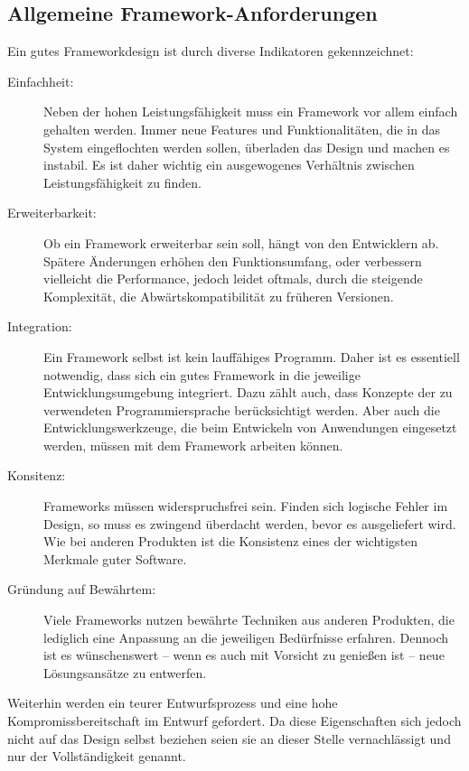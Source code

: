 \documentclass{hswpaper}
\begin{document}
\subsection{Allgemeine Framework-Anforderungen}
Ein gutes Frameworkdesign ist durch diverse Indikatoren gekennzeichnet:\begin{description}
    \item[Einfachheit:] Neben der hohen Leistungsfähigkeit muss ein Framework vor allem einfach gehalten werden. Immer neue Features und Funktionalitäten, die in das System eingeflochten werden sollen, überladen das Design und machen es instabil. Es ist daher wichtig ein ausgewogenes Verhältnis zwischen Leistungsfähigkeit zu finden.
    \item[Erweiterbarkeit:] Ob ein Framework erweiterbar sein soll, hängt von den Entwicklern ab. Spätere Änderungen erhöhen den Funktionsumfang, oder verbessern vielleicht die Performance, jedoch leidet oftmals, durch die steigende Komplexität, die Abwärtskompatibilität zu früheren Versionen.
    \item[Integration:] Ein Framework selbst ist kein lauffähiges Programm. Daher ist es essentiell notwendig, dass sich ein gutes Framework in die jeweilige Entwicklungsumgebung integriert. Dazu zählt auch, dass Konzepte der zu verwendeten Programmiersprache berücksichtigt werden. Aber auch die Entwicklungswerkzeuge, die beim Entwickeln von Anwendungen eingesetzt werden, müssen mit dem Framework arbeiten können.
    \item[Konsitenz:] Frameworks müssen widerspruchsfrei sein. Finden sich logische Fehler im Design, so muss es zwingend überdacht werden, bevor es ausgeliefert wird. Wie bei anderen Produkten ist die Konsistenz eines der wichtigsten Merkmale guter Software.
    \item[Gründung auf Bewährtem:] Viele Frameworks nutzen bewährte Techniken aus anderen Produkten, die lediglich eine Anpassung an die jeweiligen Bedürfnisse erfahren. Dennoch ist es wünschenswert -- wenn es auch mit Vorsicht zu genießen ist -- neue Lösungsansätze zu entwerfen.
\end{description}\par Weiterhin werden ein teurer Entwurfsprozess und eine hohe Kompromissbereitschaft im Entwurf gefordert. Da diese Eigenschaften sich jedoch nicht auf das Design selbst beziehen seien sie an dieser Stelle vernachlässigt und nur der Vollständigkeit genannt.
\end{document}
